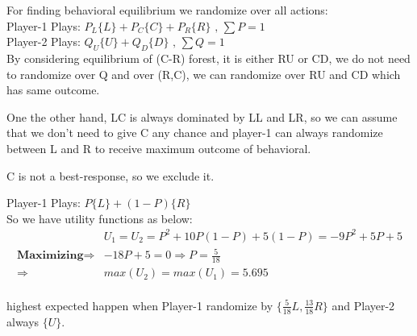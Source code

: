 \documentclass[
  course = {{IE579 Game Theory and Multi-Agent Reinforcement Learning}},
  quartile = {{4}},
  assignment = 2,
  name = {{Mohammad Mahdi Rahimi}},
  studentnumber = {{20208244}},
  email = {{mahi@kaist.ac.kr}},
  firstexercise = 1
]{aga-homework}
\begin{document}
For finding behavioral equilibrium we randomize over all actions:\\
Player-1 Plays: $P_L\{L\} + P_C\{C\} + P_R\{R\} \text{ ,  } \sum{P} = 1$\\
Player-2 Plays: $Q_U\{U\} + Q_D\{D\} \text{ ,  } \sum{Q} = 1$\\

By considering equilibrium of (C-R) forest, it is either RU or CD, we do not need to randomize over Q and over (R,C), we can randomize over RU and CD which has same outcome.

One the other hand, LC is always dominated by LL and LR, so we can assume that we don't need to give C any chance and player-1 can always randomize between L and R to receive maximum outcome of behavioral.

C is not a best-response, so we exclude it.

Player-1 Plays: $P\{L\} + (1 -P)\{R\}$\\

So we have utility functions as below:
\begin{equation} \label{eq1}
\begin{split}
& U_1 = U_2 = P^2 + 10P(1-P) + 5(1-P) = -9P^2 + 5P + 5 \\
\textbf{Maximizing} \Rightarrow & -18P + 5 = 0 \Rightarrow P = \frac{5}{18}\\
\Rightarrow & max(U_2) = max(U_1) = 5.695
\end{split}
\end{equation}\\
highest expected happen when Player-1 randomize by $\{\frac{5}{18}L, \frac{13}{18}R\}$ and Player-2 always $\{U\}$.
\end{document}
